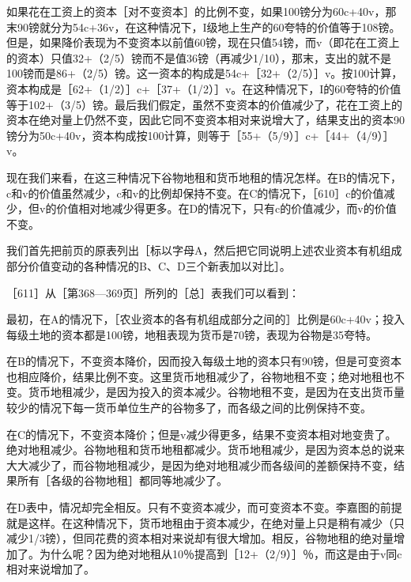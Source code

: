 如果花在工资上的资本［对不变资本］的比例不变，如果100镑分为60c+40v，那末90镑就分为54c+36v，在这种情况下，I级地上生产的60夸特的价值等于108镑。但是，如果降价表现为不变资本以前值60镑，现在只值54镑，而v（即花在工资上的资本）只值32+（2/5）镑而不是值36镑（再减少1/10），那末，支出的就不是100镑而是86+（2/5）镑。这一资本的构成是54c+［32+（2/5）］v。按100计算，资本构成是［62+（1/2）］c+［37+（1/2）］v。在这种情况下，I的60夸特的价值等于102+（3/5）镑。最后我们假定，虽然不变资本的价值减少了，花在工资上的资本在绝对量上仍然不变，因此它同不变资本相对来说增大了，结果支出的资本90镑分为50c+40v，资本构成按100计算，则等于［55+（5/9）］c+［44+（4/9）］v。

现在我们来看，在这三种情况下谷物地租和货币地租的情况怎样。在B的情况下，c和v的价值虽然减少，c和v的比例却保持不变。在C的情况下，［610］c的价值减少，但v的价值相对地减少得更多。在D的情况下，只有c的价值减少，而v的价值不变。

我们首先把前页的原表列出［标以字母A，然后把它同说明上述农业资本有机组成部分价值变动的各种情况的B、C、D三个新表加以对比］。

\todo{}

\todo{}

［611］从［第368—369页］所列的［总］表我们可以看到：

最初，在A的情况下，［农业资本的各有机组成部分之间的］比例是60c+40v；投入每级土地的资本都是100镑，地租表现为货币是70镑，表现为谷物是35夸特。

在B的情况下，不变资本降价，因而投入每级土地的资本只有90镑，但是可变资本也相应降价，结果比例不变。这里货币地租减少了，谷物地租不变；绝对地租也不变。货币地租减少，是因为投入的资本减少。谷物地租不变，是因为在支出货币量较少的情况下每一货币单位生产的谷物多了，而各级之间的比例保持不变。

在C的情况下，不变资本降价；但是v减少得更多，结果不变资本相对地变贵了。绝对地租减少。谷物地租和货币地租都减少。货币地租减少，是因为资本总的说来大大减少了，而谷物地租减少，是因为绝对地租减少而各级间的差额保持不变，结果所有［各级的谷物地租］都同等地减少了。

在D表中，情况却完全相反。只有不变资本减少，而可变资本不变。李嘉图的前提就是这样。在这种情况下，货币地租由于资本减少，在绝对量上只是稍有减少（只减少1/3镑），但同花费的资本相对来说却有很大增加。相反，谷物地租的绝对量增加了。为什么呢？因为绝对地租从10％提高到［12+（2/9）］％，而这是由于v同c相对来说增加了。

